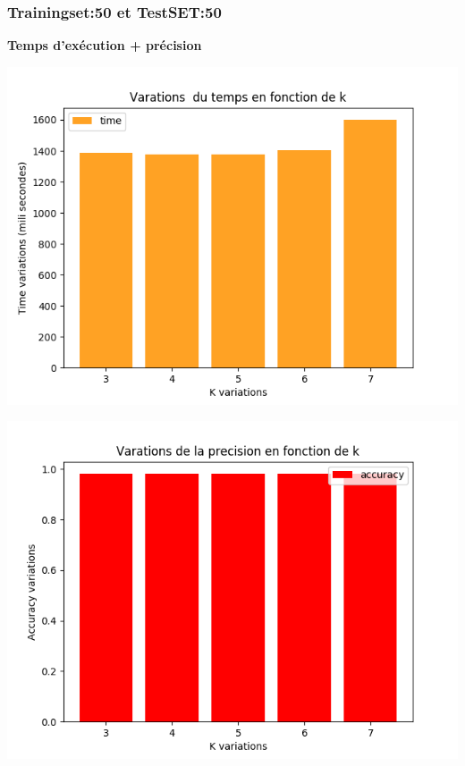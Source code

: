 \documentclass[12pt,a4paper,oneside]{book}
\begin{document}
	
	\subsubsection{Trainingset:50 et TestSET:50}
	\textbf{Temps d'exécution + précision}\\
	\begin{frame}{}
		\centering
		\begin{minipage}[b]{0.5\linewidth}
			\includegraphics[scale=0.5]{image/data2:Train,50,Test,50time.png}
			\label{labelname}%
		\end{minipage}
		\hspace{0.5cm}
		\begin{minipage}[b]{0.5\linewidth}
			\includegraphics[scale=0.5]{image/data2:Train,50,Test,50:accuracy.png}%
			\label{labelname}%
		\end{minipage}
	\end{frame}
	
\end{document}
